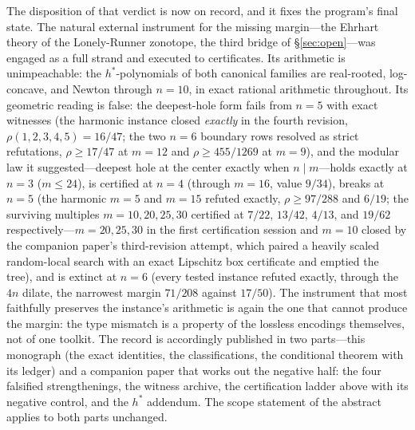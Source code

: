 The disposition of that verdict is now on record, and it fixes the
program's final state. The natural external instrument for the missing
margin---the Ehrhart theory of the Lonely-Runner zonotope, the third
bridge of \S\ref{sec:open}---was engaged as a full strand and executed
to certificates. Its arithmetic is unimpeachable: the $h^*$-polynomials
of both canonical families are real-rooted, log-concave, and Newton
through $n=10$, in exact rational arithmetic throughout. Its geometric
reading is false: the deepest-hole form fails from $n=5$ with exact
witnesses (the harmonic instance closed \emph{exactly} in the fourth
revision, $\rho(1,2,3,4,5)=16/47$; the two $n=6$ boundary rows
resolved as strict refutations, $\rho\ge17/47$ at $m=12$ and
$\rho\ge455/1269$ at $m=9$),
and the modular law it suggested---deepest hole at the center exactly
when $n\mid m$---holds exactly at $n=3$ ($m\le 24$), is certified at
$n=4$ (through $m=16$, value $9/34$), breaks at $n=5$ (the harmonic
$m=5$ and $m=15$ refuted exactly, $\rho\ge 97/288$ and $6/19$; the
surviving multiples $m=10,20,25,30$ certified at $7/22$, $13/42$,
$4/13$, and $19/62$ respectively---$m=20,25,30$ in the first
certification session and $m=10$ closed by the companion paper's
third-revision attempt, which paired a heavily scaled random-local
search with an exact Lipschitz box certificate and emptied the tree),
and is
extinct at $n=6$ (every tested instance refuted exactly, through the
$4n$ dilate, the narrowest margin $71/208$ against $17/50$). The
instrument that most faithfully preserves the instance's arithmetic is
again the one that cannot produce the margin: the type mismatch is a
property of the lossless encodings themselves, not of one toolkit.
The record is accordingly published in two parts---this monograph (the
exact identities, the classifications, the conditional theorem with
its ledger) and a companion paper \cite{companion-paper} that works
out the negative half: the four falsified strengthenings, the witness
archive, the certification ladder above with its negative control, and
the $h^*$ addendum. The scope statement of the abstract applies to
both parts unchanged.
